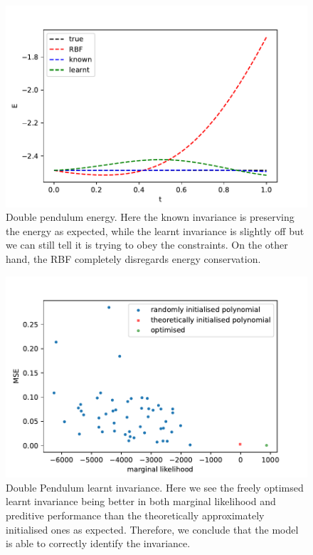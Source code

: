 \documentclass{statsmsc}
\begin{document}
\begin{figure}[H] 
  \includegraphics[width=0.8\linewidth]{../codes/figures/double_pendulum_energy.pdf}
  \centering
  \caption{Double pendulum energy. Here the known invariance is preserving the energy as expected, while the learnt invariance is slightly off but we can still tell it is trying to obey the constraints. On the other hand, the RBF completely disregards energy conservation.}
  \label{fig:double_pendulum_energy}
\end{figure}

\begin{figure}[H] 
  \includegraphics[width=0.8\linewidth]{../codes/figures/double_pendulum_polynomial.pdf}
  \centering
  \caption{Double Pendulum learnt invariance. Here we see the freely optimsed learnt invariance being better in both marginal likelihood and preditive performance than the theoretically approximately initialised ones as expected. Therefore, we conclude that the model is able to correctly identify the invariance.}
  \label{fig:double_pendulum_poly}
\end{figure}
\end{document}
